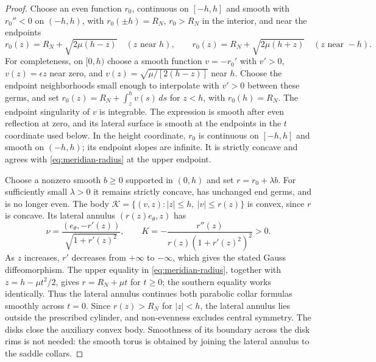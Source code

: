 \documentclass[11pt]{amsart}
\theoremstyle{definition}
\theoremstyle{remark}
\numberwithin{equation}{section}
\begin{document}
\begin{proof}
Choose an even function $r_0$, continuous on $[-h,h]$ and smooth
with $r_0''<0$ on $(-h,h)$, with
$r_0(\pm h)=R_N$, $r_0>R_N$ in the interior, and near the endpoints
\begin{equation}\label{eq:meridian-radius}
 r_0(z)=R_N+\sqrt{2\mu(h-z)}\quad(z\text{ near }h),
 \qquad
 r_0(z)=R_N+\sqrt{2\mu(h+z)}\quad(z\text{ near }-h).
\end{equation}
For completeness, on $[0,h)$ choose a smooth function $v=-r_0'$
with $v'>0$, $v(z)=\epsilon z$ near zero, and
$v(z)=\sqrt{\mu/[2(h-z)]}$ near $h$. Choose the endpoint
neighborhoods small enough to interpolate with $v'>0$ between
these germs, and set
$r_0(z)=R_N+\int_z^h v(s)\,ds$ for $z<h$, with $r_0(h)=R_N$.
The endpoint singularity of $v$ is integrable. The expression is smooth
after even reflection at zero, and its lateral surface is smooth at
the endpoints in the $t$ coordinate used below. In the height
coordinate, $r_0$ is continuous on $[-h,h]$ and smooth on $(-h,h)$;
its endpoint slopes are infinite. It is strictly concave and agrees with
\eqref{eq:meridian-radius} at the upper endpoint.

Choose a nonzero smooth $b\ge0$ supported in $(0,h)$ and set
$r=r_0+\lambda b$. For sufficiently small $\lambda>0$ it remains
strictly concave, has unchanged end germs, and is no longer even.
The body $\mathcal K=\{(v,z):|z|\le h,\ |v|\le r(z)\}$ is convex,
since $r$ is concave. Its lateral annulus $(r(z)e_\theta,z)$ has
\[
 \nu=\frac{(e_\theta,-r'(z))}{\sqrt{1+r'(z)^2}},\qquad
 K=-\frac{r''(z)}{r(z)(1+r'(z)^2)^2}>0.
\]
As $z$ increases, $r'$ decreases from $+\infty$ to $-\infty$,
which gives the stated Gauss diffeomorphism. The upper equality in
\eqref{eq:meridian-radius}, together with
$z=h-\mu t^2/2$, gives $r=R_N+\mu t$ for $t\ge0$;
the southern equality works identically. Thus the lateral annulus
continues both parabolic collar formulas smoothly across $t=0$.
Since $r(z)>R_N$ for $|z|<h$, the lateral annulus
lies outside the prescribed cylinder, and non-evenness excludes
central symmetry. The disks close the auxiliary convex body. Smoothness
of its boundary across the disk rims is not needed: the smooth torus
is obtained by joining the lateral annulus to the saddle collars.
\end{proof}
\end{document}
